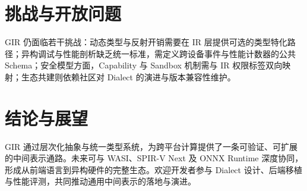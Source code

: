 \chapter{挑战与开放问题}
GIR 仍面临若干挑战：动态类型与反射开销需要在 IR 层提供可选的类型特化路径；异构调试与性能剖析缺乏统一标准，需定义跨设备事件与性能计数器的公共 Schema；安全模型方面，Capability 与 Sandbox 机制需与 IR 权限标签双向映射；生态共建则依赖社区对 Dialect 的演进与版本兼容性维护。\par
\chapter{结论与展望}
GIR 通过层次化抽象与统一类型系统，为跨平台计算提供了一条可验证、可扩展的中间表示通路。未来可与 WASI、SPIR-V Next 及 ONNX Runtime 深度协同，形成从前端语言到异构硬件的完整生态。欢迎开发者参与 Dialect 设计、后端移植与性能评测，共同推动通用中间表示的落地与演进。\par

